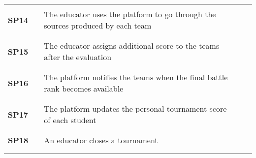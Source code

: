 \begin{longtable}[H]{l l p{8.5cm} l l}
                  &        &                                                                                                          &        &                        \\\hline & & & & \\
    \textbf{SP14} & \vline & The educator uses the platform to go through the sources produced by each team                           & \vline &                        \\
                  &        &                                                                                                          &        &                        \\\hline & & & & \\
    \textbf{SP15} & \vline & The educator assigns additional score to the teams after the evaluation                                  & \vline &                        \\
                  &        &                                                                                                          &        &                        \\\hline & & & & \\
    \textbf{SP16} & \vline & The platform notifies the teams when the final battle rank becomes available                             & \vline &                        \\
                  &        &                                                                                                          &        &                        \\\hline & & & & \\
    \textbf{SP17} & \vline & The platform updates the personal tournament score of each student                                       & \vline &                        \\
                  &        &                                                                                                          &        &                        \\\hline & & & & \\
    \textbf{SP18} & \vline & An educator closes a tournament                                                                          & \vline &                        \\
                  &        &                                                                                                          &        &                        \\\hline & & & & \\

\end{longtable}
